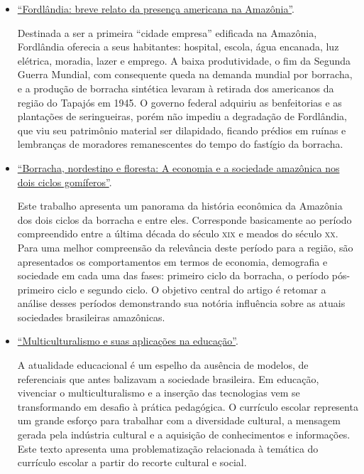 \documentclass[11pt]{extarticle}
\begin{document}
\begin{itemize}
	\item \href{https://periodicos.saude.sp.gov.br/index.php/cadernos/article/view/35751}{``Fordlândia: breve relato da presença americana na Amazônia''}. 

	Destinada a ser a primeira “cidade empresa” edificada na Amazônia, Fordlândia oferecia a seus habitantes: hospital, escola, água encanada, luz elétrica, moradia, lazer e emprego. A baixa produtividade, o fim da Segunda Guerra Mundial, com consequente queda na demanda mundial por borracha, e a produção de borracha sintética levaram à retirada dos americanos da região do Tapajós em 1945. O governo federal adquiriu as benfeitorias e as plantações de seringueiras, porém não impediu a degradação de Fordlândia, que viu seu patrimônio material ser dilapidado, ficando prédios em ruínas e lembranças de moradores remanescentes do tempo do fastígio da borracha. 


	\item \href{https://periodicos.ufpa.br/index.php/cepec/article/view/6773/0}{``Borracha, nordestino e floresta: A economia e a sociedade amazônica nos dois ciclos gomíferos''}.  
	
	Este trabalho apresenta um panorama da história econômica da Amazônia dos dois ciclos da borracha e entre eles. Corresponde basicamente ao período compreendido entre a última década do século \textsc{xix} e meados do século \textsc{xx}. Para uma melhor compreensão da relevância deste período para a região, são apresentados os comportamentos em termos de economia, demografia e sociedade em cada uma das fases: primeiro ciclo da borracha, o período pós-primeiro ciclo e segundo ciclo. O objetivo central do artigo é retomar a análise desses períodos demonstrando sua notória influência sobre as atuais sociedades brasileiras amazônicas.

	\item \href{https://educacaopublica.cecierj.edu.br/artigos/19/1/multiculturalismo-e-suas-implicaes-na-educao}{``Multiculturalismo e suas aplicações na educação''}. 

	A atualidade educacional é um espelho da ausência de modelos, de referenciais que antes balizavam a sociedade brasileira. Em educação, vivenciar o multiculturalismo e a inserção das tecnologias vem se transformando em desafio à prática pedagógica. O currículo escolar representa um grande esforço para trabalhar com a diversidade cultural, a mensagem gerada pela indústria cultural e a aquisição de conhecimentos e informações. Este texto apresenta uma problematização relacionada à temática do currículo escolar a partir do recorte cultural e social.
\end{itemize}
\end{document}
